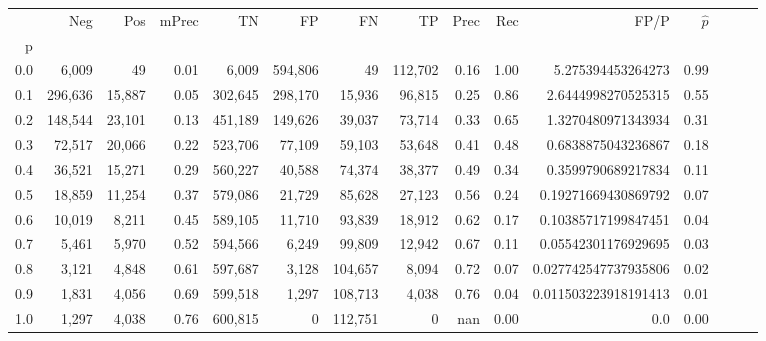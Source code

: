 \begin{tabular}{rrrrrrrrrrrrrrr}
\toprule
{} &      Neg &     Pos & mPrec &       TN &       FP &       FN &       TP &  Prec &   Rec &                  FP/P & $\hat{p}$ \\
p   &          &         &       &          &          &          &          &       &       &                       &           \\
\midrule
0.0 &    6,009 &      49 &  0.01 &    6,009 &  594,806 &       49 &  112,702 &  0.16 &  1.00 &     5.275394453264273 &      0.99 \\
0.1 &  296,636 &  15,887 &  0.05 &  302,645 &  298,170 &   15,936 &   96,815 &  0.25 &  0.86 &    2.6444998270525315 &      0.55 \\
0.2 &  148,544 &  23,101 &  0.13 &  451,189 &  149,626 &   39,037 &   73,714 &  0.33 &  0.65 &    1.3270480971343934 &      0.31 \\
0.3 &   72,517 &  20,066 &  0.22 &  523,706 &   77,109 &   59,103 &   53,648 &  0.41 &  0.48 &    0.6838875043236867 &      0.18 \\
0.4 &   36,521 &  15,271 &  0.29 &  560,227 &   40,588 &   74,374 &   38,377 &  0.49 &  0.34 &    0.3599790689217834 &      0.11 \\
0.5 &   18,859 &  11,254 &  0.37 &  579,086 &   21,729 &   85,628 &   27,123 &  0.56 &  0.24 &   0.19271669430869792 &      0.07 \\
0.6 &   10,019 &   8,211 &  0.45 &  589,105 &   11,710 &   93,839 &   18,912 &  0.62 &  0.17 &   0.10385717199847451 &      0.04 \\
0.7 &    5,461 &   5,970 &  0.52 &  594,566 &    6,249 &   99,809 &   12,942 &  0.67 &  0.11 &   0.05542301176929695 &      0.03 \\
0.8 &    3,121 &   4,848 &  0.61 &  597,687 &    3,128 &  104,657 &    8,094 &  0.72 &  0.07 &  0.027742547737935806 &      0.02 \\
0.9 &    1,831 &   4,056 &  0.69 &  599,518 &    1,297 &  108,713 &    4,038 &  0.76 &  0.04 &  0.011503223918191413 &      0.01 \\
1.0 &    1,297 &   4,038 &  0.76 &  600,815 &        0 &  112,751 &        0 &   nan &  0.00 &                   0.0 &      0.00 \\
\bottomrule
\end{tabular}
